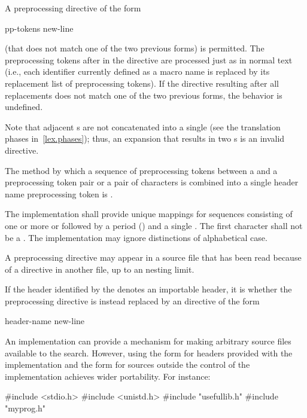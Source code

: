 \pnum
A preprocessing directive of the form
\begin{ncsimplebnf}
 pp-tokens new-line
\end{ncsimplebnf}
(that does not match one of the two previous forms) is permitted.
The preprocessing tokens after
in the directive are processed just as in normal text
(i.e., each identifier currently defined as a macro name is replaced by its
replacement list of preprocessing tokens).
If the directive resulting after all replacements does not match
one of the two previous forms, the behavior is
undefined.
\begin{footnote}
Note that adjacent s are not concatenated into
a single 
(see the translation phases in~\ref{lex.phases});
thus, an expansion that results in two s is an
invalid directive.
\end{footnote}
The method by which a sequence of preprocessing tokens between a
\tcode{<}
and a
\tcode{>}
preprocessing token pair or a pair of
characters is combined into a single header name
preprocessing token is .

\pnum
The implementation shall provide unique mappings for
sequences consisting of one or more
 or 
followed by a period
()
and a single
.
The first character shall not be a .
The implementation may ignore distinctions of alphabetical case.

\pnum
A
preprocessing directive may appear
in a source file that has been read because of a
directive in another file,
up to an  nesting limit.

\pnum
If the header identified by the 
denotes an importable header,
it is
whether the  preprocessing directive
is instead replaced by an  directive of the form
\begin{ncbnf}
 header-name \terminal{;} new-line
\end{ncbnf}

\pnum
\begin{note}
An implementation can provide a mechanism for making arbitrary
source files available to the \tcode{< >} search.
However, using the \tcode{< >} form for headers provided
with the implementation and the  form for sources
outside the control of the implementation
achieves wider portability. For instance:
\begin{codeblock}
#include <stdio.h>
#include <unistd.h>
#include "usefullib.h"
#include "myprog.h"
\end{codeblock}
\end{note}

